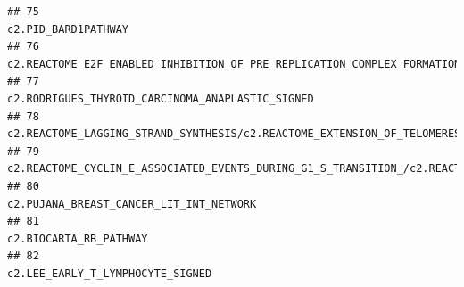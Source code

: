 \documentclass{article}\usepackage[]{graphicx}\usepackage[]{color}
\makeatletter
\newenvironment{kframe}{%
 \def\at@end@of@kframe{}%
 \ifinner\ifhmode%
  \def\at@end@of@kframe{\end{minipage}}%
  \begin{minipage}{\columnwidth}%
 \fi\fi%
 \def\FrameCommand##1{\hskip\@totalleftmargin \hskip-\fboxsep
 \colorbox{shadecolor}{##1}\hskip-\fboxsep
     \hskip-\linewidth \hskip-\@totalleftmargin \hskip\columnwidth}%
 \MakeFramed {\advance\hsize-\width
   \@totalleftmargin\z@ \linewidth\hsize
   \@setminipage}}%
 {\par\unskip\endMakeFramed%
 \at@end@of@kframe}
\newenvironment{knitrout}{}{} %
\makeatother
\begin{document}
\begin{knitrout}
\begin{kframe}
\begin{verbatim}
## 75                                                                                                                                                                                                                                                                                                                                    c2.PID_BARD1PATHWAY
## 76                                                                                                                                                                                                                                                                                c2.REACTOME_E2F_ENABLED_INHIBITION_OF_PRE_REPLICATION_COMPLEX_FORMATION
## 77                                                                                                                                                                                                                                                                                                       c2.RODRIGUES_THYROID_CARCINOMA_ANAPLASTIC_SIGNED
## 78                                                                                                                                                                                                                                                                                c2.REACTOME_LAGGING_STRAND_SYNTHESIS/c2.REACTOME_EXTENSION_OF_TELOMERES
## 79  c2.REACTOME_CYCLIN_E_ASSOCIATED_EVENTS_DURING_G1_S_TRANSITION_/c2.REACTOME_REGULATION_OF_MITOTIC_CELL_CYCLE/c2.REACTOME_APC_C_CDH1_MEDIATED_DEGRADATION_OF_CDC20_AND_OTHER_APC_C_CDH1_TARGETED_PROTEINS_IN_LATE_MITOSIS_EARLY_G1/c2.REACTOME_APC_C_CDC20_MEDIATED_DEGRADATION_OF_MITOTIC_PROTEINS/c2.REACTOME_SCFSKP2_MEDIATED_DEGRADATION_OF_P27_P21
## 80                                                                                                                                                                                                                                                                                                                c2.PUJANA_BREAST_CANCER_LIT_INT_NETWORK
## 81                                                                                                                                                                                                                                                                                                                                 c2.BIOCARTA_RB_PATHWAY
## 82                                                                                                                                                                                                                                                                                                                       c2.LEE_EARLY_T_LYMPHOCYTE_SIGNED

\end{verbatim}
\end{kframe}
\end{knitrout}
\end{document}
